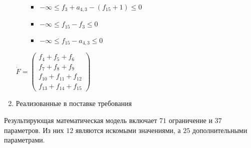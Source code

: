 \begin{enumerate}
\begin{itemize}
\begin{itemize}
      \item[] $-\infty \le f_{3} + a_{4,3} - (f_{15} + 1) \le 0$ %
      \item[] $-\infty \le f_{15} - f_{3} \le 0$ %
      \item[] $-\infty \le f_{15} - a_{4,3} \le 0$ %
    \end{itemize}
  \end{itemize}
  \begin{center}
    $
      \dot{F}
      =
      \begin{pmatrix}
        f_{4} + f_{5} + f_{6} \\ 
        f_{7} + f_{8} + f_{9} \\
        f_{10} + f_{11} + f_{12} \\
        f_{13} + f_{14} + f_{15}
      \end{pmatrix}
    $
  \end{center}
  \item Реализованные в поставке требования

\end{enumerate}

Результирующая математическая модель включает $71$ ограничение и $37$ параметров. Из них $12$ являются искомыми значениями, а $25$ дополнительными параметрами.